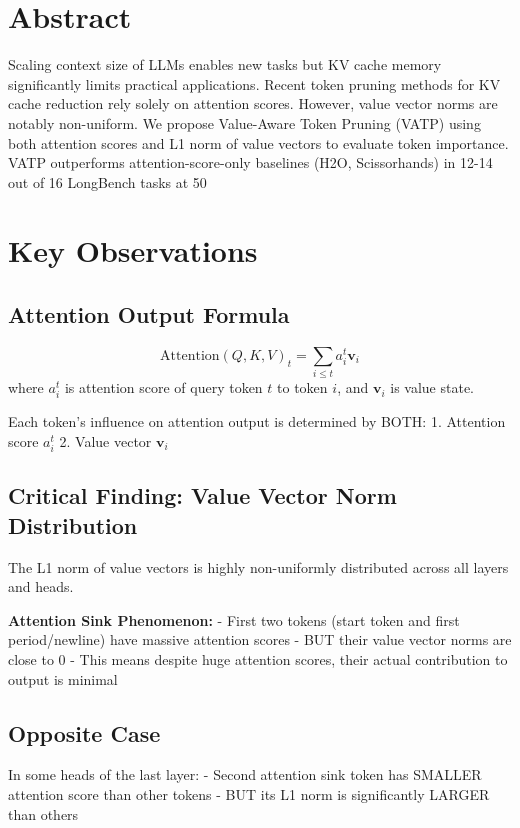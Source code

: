 
\section{Abstract}
Scaling context size of LLMs enables new tasks but KV cache memory significantly limits practical applications. Recent token pruning methods for KV cache reduction rely solely on attention scores. However, value vector norms are notably non-uniform. We propose Value-Aware Token Pruning (VATP) using both attention scores and L1 norm of value vectors to evaluate token importance. VATP outperforms attention-score-only baselines (H2O, Scissorhands) in 12-14 out of 16 LongBench tasks at 50%

\section{Key Observations}

\subsection{Attention Output Formula}
\begin{equation}
\text{Attention}(Q, K, V)_t = \sum_{i \leq t} a_i^t \mathbf{v}_i
\end{equation}
where $a_i^t$ is attention score of query token $t$ to token $i$, and $\mathbf{v}_i$ is value state.

Each token's influence on attention output is determined by BOTH:
1. Attention score $a_i^t$
2. Value vector $\mathbf{v}_i$

\subsection{Critical Finding: Value Vector Norm Distribution}
The L1 norm of value vectors is highly non-uniformly distributed across all layers and heads.

\textbf{Attention Sink Phenomenon:}
- First two tokens (start token and first period/newline) have massive attention scores
- BUT their value vector norms are close to 0
- This means despite huge attention scores, their actual contribution to output is minimal

\subsection{Opposite Case}
In some heads of the last layer:
- Second attention sink token has SMALLER attention score than other tokens
- BUT its L1 norm is significantly LARGER than others

